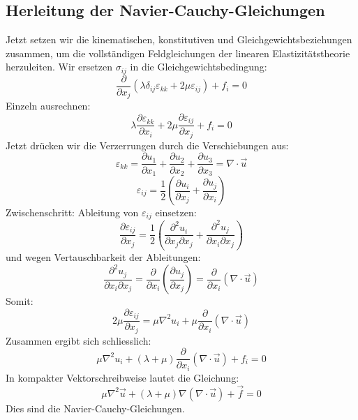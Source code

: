 \subsection{Herleitung der Navier-Cauchy-Gleichungen}
Jetzt setzen wir die kinematischen, konstitutiven und Gleichgewichtsbeziehungen zusammen, um die vollständigen Feldgleichungen der linearen Elastizitätstheorie herzuleiten.
Wir ersetzen $\sigma_{ij}$ in die Gleichgewichtsbedingung:
\begin{equation}
	\frac{\partial}{\partial x_j}\left( \lambda \delta_{ij} \varepsilon_{kk} + 2\mu \varepsilon_{ij} \right) + f_i = 
	0
\end{equation}
Einzeln ausrechnen:
\begin{equation}
	\lambda \frac{\partial \varepsilon_{kk}}{\partial x_i} + 2\mu \frac{\partial \varepsilon_{ij}}{\partial x_j} + f_i = 
	0
\end{equation}
Jetzt drücken wir die Verzerrungen durch die Verschiebungen aus:
\begin{equation}
	\varepsilon_{kk} = 
	\frac{\partial u_1}{\partial x_1} + \frac{\partial u_2}{\partial x_2} + \frac{\partial u_3}{\partial x_3} = 
	\nabla \cdot \vec{u}
\end{equation}
\begin{equation}
	\varepsilon_{ij} = 
	\frac{1}{2}\left( \frac{\partial u_i}{\partial x_j} + \frac{\partial 	u_j}{\partial x_i} \right)
\end{equation}
Zwischenschritt: Ableitung von $\varepsilon_{ij}$ einsetzen:
\begin{equation}
	\frac{\partial \varepsilon_{ij}}{\partial x_j} = 
	\frac{1}{2}\left( \frac{\partial^2 u_i}{\partial x_j \partial x_j} + \frac{\partial^2 u_j}{\partial x_i \partial x_j} \right)
\end{equation}
und wegen Vertauschbarkeit der Ableitungen:
\begin{equation}
	\frac{\partial^2 u_j}{\partial x_i \partial x_j} = 
	\frac{\partial}{\partial x_i}\left( \frac{\partial u_j}{\partial x_j} \right) = 	\frac{\partial}{\partial x_i}(\nabla \cdot \vec{u})
\end{equation}
Somit:
\begin{equation}
	2\mu \frac{\partial \varepsilon_{ij}}{\partial x_j} = 
	\mu \nabla^2 u_i + \mu 	\frac{\partial}{\partial x_i}(\nabla \cdot \vec{u})
\end{equation}
Zusammen ergibt sich schliesslich:
\begin{equation}
	\mu \nabla^2 u_i + (\lambda+\mu) \frac{\partial}{\partial x_i}(\nabla \cdot \vec{u}) + f_i = 
	0
\end{equation}
In kompakter Vektorschreibweise lautet die Gleichung:
\begin{equation}
	\mu \nabla^2 \vec{u} + (\lambda+\mu) \nabla (\nabla \cdot \vec{u}) + \vec{f} = 
	0
\end{equation}
Dies sind die Navier-Cauchy-Gleichungen.

